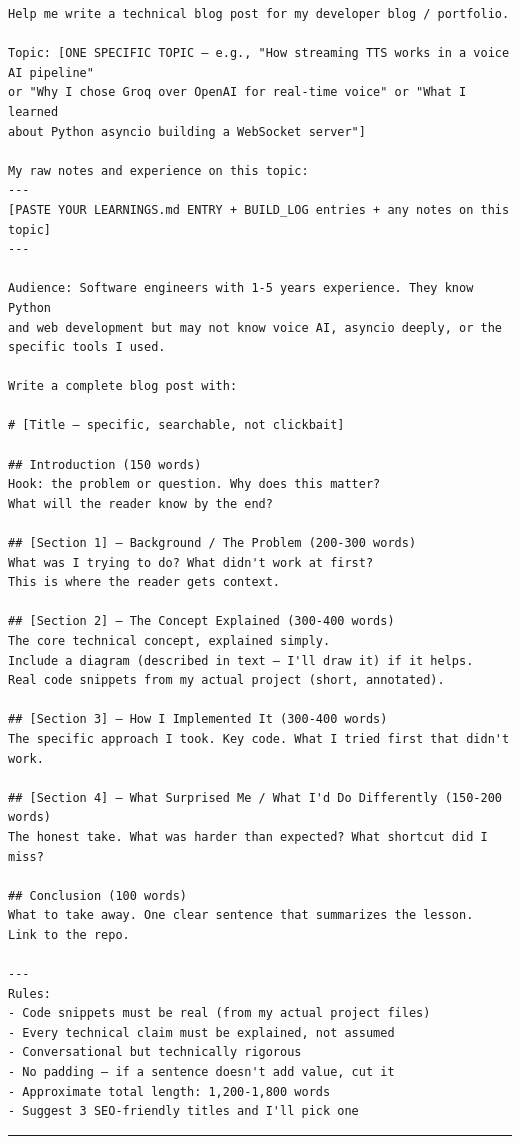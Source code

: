 \documentclass[
  11pt,
]{article}
\begin{document}
\begin{lstlisting}
Help me write a technical blog post for my developer blog / portfolio.

Topic: [ONE SPECIFIC TOPIC — e.g., "How streaming TTS works in a voice AI pipeline"
or "Why I chose Groq over OpenAI for real-time voice" or "What I learned
about Python asyncio building a WebSocket server"]

My raw notes and experience on this topic:
---
[PASTE YOUR LEARNINGS.md ENTRY + BUILD_LOG entries + any notes on this topic]
---

Audience: Software engineers with 1-5 years experience. They know Python
and web development but may not know voice AI, asyncio deeply, or the
specific tools I used.

Write a complete blog post with:

# [Title — specific, searchable, not clickbait]

## Introduction (150 words)
Hook: the problem or question. Why does this matter?
What will the reader know by the end?

## [Section 1] — Background / The Problem (200-300 words)
What was I trying to do? What didn't work at first?
This is where the reader gets context.

## [Section 2] — The Concept Explained (300-400 words)
The core technical concept, explained simply.
Include a diagram (described in text — I'll draw it) if it helps.
Real code snippets from my actual project (short, annotated).

## [Section 3] — How I Implemented It (300-400 words)
The specific approach I took. Key code. What I tried first that didn't work.

## [Section 4] — What Surprised Me / What I'd Do Differently (150-200 words)
The honest take. What was harder than expected? What shortcut did I miss?

## Conclusion (100 words)
What to take away. One clear sentence that summarizes the lesson.
Link to the repo.

---
Rules:
- Code snippets must be real (from my actual project files)
- Every technical claim must be explained, not assumed
- Conversational but technically rigorous
- No padding — if a sentence doesn't add value, cut it
- Approximate total length: 1,200-1,800 words
- Suggest 3 SEO-friendly titles and I'll pick one
\end{lstlisting}

\begin{center}\rule{0.5\linewidth}{0.5pt}\end{center}
\end{document}
